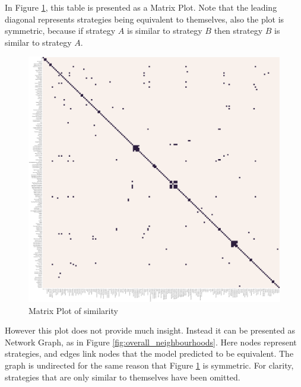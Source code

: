 In Figure \ref{fig:matrix_similarity}, this table is presented as a Matrix Plot.
Note that the leading diagonal represents strategies being equivalent to themselves, also the plot is symmetric, because if strategy $A$ is similar to strategy $B$ then strategy $B$ is similar to strategy $A$.

\begin{figure}[htbp!]
    \centering
    \includegraphics[width=0.8\linewidth]{../img/ML/similarity_heatmap.png}
    \caption{Matrix Plot of similarity}
    \label{fig:matrix_similarity}
\end{figure}

However this plot does not provide much insight.
Instead it can be presented as Network Graph, as in Figure \ref{fig:overall_neighbourhoods}.
Here nodes represent strategies, and edges link nodes that the model predicted to be equivalent.
The graph is undirected for the same reason that Figure \ref{fig:matrix_similarity} is symmetric.
For clarity, strategies that are only similar to themselves have been omitted.

